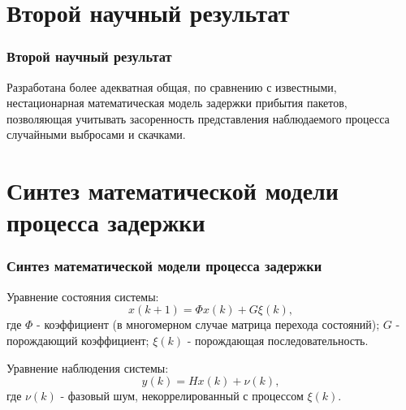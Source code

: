 \documentclass[10pt,pdf,hyperref={unicode}]{beamer}
\begin{document}
\begin{frame}
\begin{scriptsize}
\begin{figure} [!bth]
\begin{scriptsize}
\begin{minipage}[h]{0.95\linewidth}
  \end{minipage}
\end{scriptsize}
\end{figure}
\end{scriptsize}
\end{frame}

\section{Второй научный результат}

\begin{frame}
\frametitle{Второй научный результат}

{\Large Разработана более адекватная общая, по сравнению с известными, нестационарная математическая модель задержки прибытия пакетов, позволяющая учитывать засоренность представления наблюдаемого процесса случайными выбросами и скачками.}

\end{frame}



\section{Синтез математической модели процесса задержки}
\begin{frame}
\frametitle{Синтез математической модели процесса задержки}
Уравнение состояния системы:
\begin{equation}\label{eq3:modelStat}
x(k+1)=\Phi x(k)+G\xi(k),
\end{equation}
где $\Phi$ - коэффициент (в многомерном случае матрица перехода состояний); $G$ - порождающий коэффициент; $\xi(k)$ - порождающая последовательность.

Уравнение наблюдения системы:
\begin{equation}\label{eq3:Estim}
y(k)=Hx(k)+\nu(k),
\end{equation}
где $\nu(k)$ - фазовый шум, некоррелированный с процессом $\xi(k)$.
\end{frame}
\end{document}
